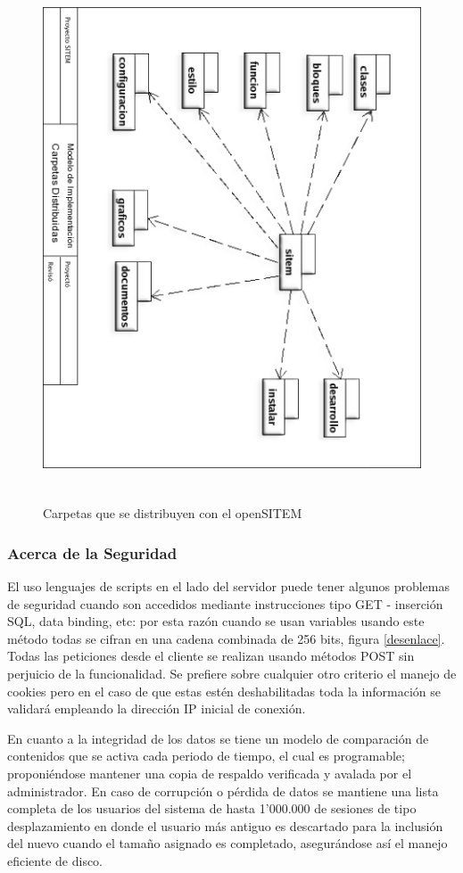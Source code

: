 \begin{figure}
 \centering
 \includegraphics[width=156mm, height=156mm]{carpetas.png}
 \caption{Carpetas que se distribuyen con el openSITEM}
 \label{carpetas_sitem}
\end{figure}

\subsubsection{Acerca de la Seguridad}
El uso lenguajes de scripts en el lado del servidor puede tener algunos problemas de seguridad cuando son accedidos mediante instrucciones tipo GET - inserción SQL, data binding, etc: por esta razón cuando se usan variables usando este método todas se cifran en una cadena combinada de 256 bits, figura \ref{desenlace}. Todas las peticiones desde el cliente se realizan usando métodos POST sin perjuicio de la funcionalidad. Se prefiere sobre cualquier otro criterio el manejo de cookies pero en el caso de que estas estén deshabilitadas toda la información se validará empleando la dirección IP inicial de conexión.

En cuanto a la integridad de los datos se tiene un modelo de comparación de contenidos que se activa cada periodo de tiempo, el cual es programable; proponiéndose mantener una copia de respaldo verificada y avalada por el administrador. En caso de corrupción o pérdida de datos se mantiene una lista completa de los usuarios del sistema de hasta 1'000.000 de sesiones de tipo desplazamiento en donde el usuario más antiguo es descartado para la inclusión del nuevo cuando el tamaño asignado es completado, asegurándose así el manejo eficiente de disco.


